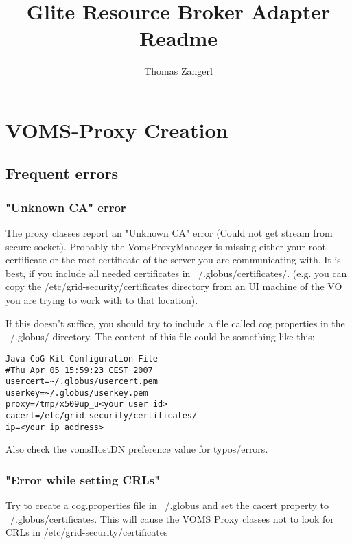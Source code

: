 \documentclass{scrreprt}
\begin{document}
		\title{Glite Resource Broker Adapter Readme}
		\author{Thomas Zangerl}
		\maketitle
		\tableofcontents

\chapter{VOMS-Proxy Creation}

\section{Frequent errors}

\subsection{"Unknown CA" error}\label{unkn_ca}

The proxy classes report an "Unknown CA" error (Could not get stream from secure socket).
Probably the VomsProxyManager is missing either your root certificate
or the root certificate of the server you are communicating with.
It is best, if you include all needed certificates in ~/.globus/certificates/.
(e.g. you can copy the /etc/grid-security/certificates directory from an UI machine
of the VO you are trying to work with to that location).

If this doesn't suffice, you should try to include a file called cog.properties in the ~/.globus/
directory. The content of this file could be something like this:

\begin{verbatim}
Java CoG Kit Configuration File
#Thu Apr 05 15:59:23 CEST 2007
usercert=~/.globus/usercert.pem
userkey=~/.globus/userkey.pem
proxy=/tmp/x509up_u<your user id>
cacert=/etc/grid-security/certificates/
ip=<your ip address>
\end{verbatim}

Also check the vomsHostDN preference value for typos/errors.

\subsection{"Error while setting CRLs"}

Try to create a cog.properties file in ~/.globus and set the cacert property to ~/.globus/certificates.
This will cause the VOMS Proxy classes not to look for CRLs in /etc/grid-security/certificates
\end{document}
